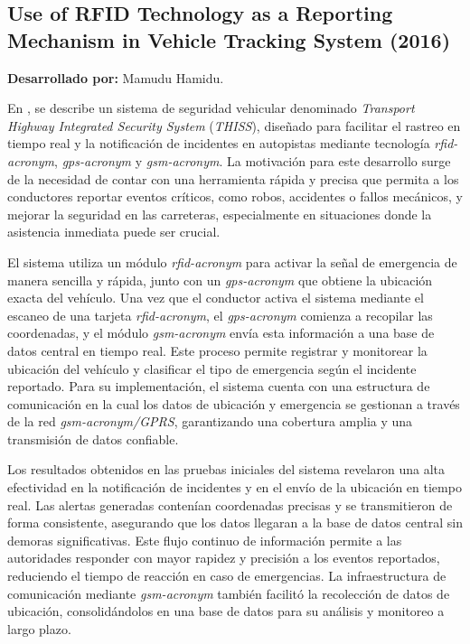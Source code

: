 \subsection{Use of RFID Technology as a Reporting Mechanism in Vehicle Tracking System (2016)}
\textbf{Desarrollado por:} Mamudu Hamidu.

En \cite{Hamidu}, se describe un sistema de seguridad vehicular denominado \textit{Transport Highway Integrated Security System} (\textit{THISS}), diseñado para facilitar el rastreo en tiempo real y la notificación de incidentes en autopistas mediante tecnología \textit{\acrshort{rfid-acronym}}, \textit{\acrshort{gps-acronym}} y \textit{\acrshort{gsm-acronym}}. La motivación para este desarrollo surge de la necesidad de contar con una herramienta rápida y precisa que permita a los conductores reportar eventos críticos, como robos, accidentes o fallos mecánicos, y mejorar la seguridad en las carreteras, especialmente en situaciones donde la asistencia inmediata puede ser crucial.

El sistema utiliza un módulo \textit{\acrshort{rfid-acronym}} para activar la señal de emergencia de manera sencilla y rápida, junto con un \textit{\acrshort{gps-acronym}} que obtiene la ubicación exacta del vehículo. Una vez que el conductor activa el sistema mediante el escaneo de una tarjeta \textit{\acrshort{rfid-acronym}}, el \textit{\acrshort{gps-acronym}} comienza a recopilar las coordenadas, y el módulo \textit{\acrshort{gsm-acronym}} envía esta información a una base de datos central en tiempo real. Este proceso permite registrar y monitorear la ubicación del vehículo y clasificar el tipo de emergencia según el incidente reportado. Para su implementación, el sistema cuenta con una estructura de comunicación en la cual los datos de ubicación y emergencia se gestionan a través de la red \textit{\acrshort{gsm-acronym}/GPRS}, garantizando una cobertura amplia y una transmisión de datos confiable.

Los resultados obtenidos en las pruebas iniciales del sistema revelaron una alta efectividad en la notificación de incidentes y en el envío de la ubicación en tiempo real. Las alertas generadas contenían coordenadas precisas y se transmitieron de forma consistente, asegurando que los datos llegaran a la base de datos central sin demoras significativas. Este flujo continuo de información permite a las autoridades responder con mayor rapidez y precisión a los eventos reportados, reduciendo el tiempo de reacción en caso de emergencias. La infraestructura de comunicación mediante \textit{\acrshort{gsm-acronym}} también facilitó la recolección de datos de ubicación, consolidándolos en una base de datos para su análisis y monitoreo a largo plazo.

